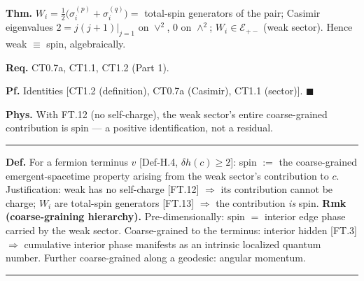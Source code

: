 \begin{theorem}[{\texorpdfstring{FT.13 — Weak $=$ spin (algebraically)}{FT.13 - Weak spin (algebraically)}}]\label{tag:FT-13}
\textbf{Thm.} $W_i=\tfrac12\bigl(\sigma_i^{(p)}+\sigma_i^{(q)}\bigr)=$ total-spin generators of the pair; Casimir eigenvalues $2=j(j{+}1)|_{j=1}$ on $\vee^2$, $0$ on $\wedge^2$; $W_i\in\mathcal E_{+-}$ (weak sector). Hence weak $\equiv$ spin, algebraically.

\textbf{Req.} CT0.7a, CT1.1, CT1.2 (Part 1).

\textbf{Pf.} Identities [CT1.2 (definition), CT0.7a (Casimir), CT1.1 (sector)]. $\blacksquare$

\textbf{Phys.} With FT.12 (no self-charge), the weak sector's entire coarse-grained contribution is spin — a positive identification, not a residual.

\vspace{2pt}\noindent\rule{\textwidth}{0.4pt}\vspace{2pt}

\end{theorem}

\begin{definition}\label{tag:Def-H-8}
\textbf{Def.} For a fermion terminus $v$ [Def-H.4, $\delta h(c)\ge2$]: spin $:=$ the coarse-grained emergent-spacetime property arising from the weak sector's contribution to $c$. Justification: weak has no self-charge [FT.12] $\Rightarrow$ its contribution cannot be charge; $W_i$ are total-spin generators [FT.13] $\Rightarrow$ the contribution \textit{is} spin. \textbf{Rmk (coarse-graining hierarchy).} Pre-dimensionally: spin $=$ interior edge phase carried by the weak sector. Coarse-grained to the terminus: interior hidden [FT.3] $\Rightarrow$ cumulative interior phase manifests as an intrinsic localized quantum number. Further coarse-grained along a geodesic: angular momentum.

\vspace{2pt}\noindent\rule{\textwidth}{0.4pt}\vspace{2pt}

\end{definition}

